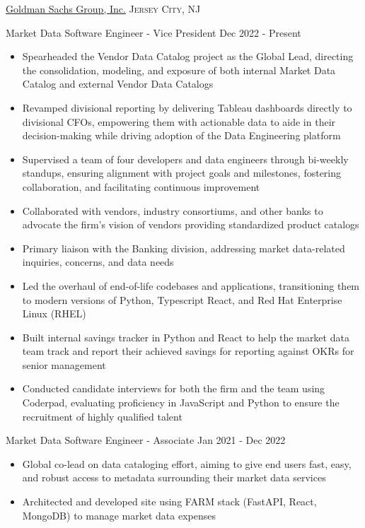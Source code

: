 \documentclass[10pt,letterpaper]{article}
\begin{document}
\headedsection
  {\href{http://www.goldmansachs.com/}{Goldman Sachs Group, Inc.}}
  {\textsc{Jersey City, NJ}} {
  \headedsubsection
    {Market Data Software Engineer - Vice President}
    {Dec 2022 - Present}
    {\begin{itemize}
    \item Spearheaded the Vendor Data Catalog project as the Global Lead, directing the consolidation, modeling, and exposure of both internal Market Data Catalog and external Vendor Data Catalogs
    \item Revamped divisional reporting by delivering Tableau dashboards directly to divisional CFOs, empowering them with actionable data to aide in their decision-making while driving adoption of the Data Engineering platform
    \item Supervised a team of four developers and data engineers through bi-weekly standups, ensuring alignment with project goals and milestones, fostering collaboration, and facilitating continuous improvement
    \item Collaborated with vendors, industry consortiums, and other banks to advocate the firm's vision of vendors providing standardized product catalogs
    \item Primary liaison with the Banking division, addressing market data-related inquiries, concerns, and data needs
    \item Led the overhaul of end-of-life codebases and applications, transitioning them to modern versions of Python, Typescript React, and Red Hat Enterprise Linux (RHEL)
    \item Built internal savings tracker in Python and React to help the market data team track and report their achieved savings for reporting against OKRs for senior management
    \item Conducted candidate interviews for both the firm and the team using Coderpad, evaluating proficiency in JavaScript and Python to ensure the recruitment of highly qualified talent
    \end{itemize}}
  \headedsubsection
    {Market Data Software Engineer - Associate}
    {Jan 2021 - Dec 2022}
    {\begin{itemize}
    \item Global co-lead on data cataloging effort, aiming to give end users fast, easy, and robust access to metadata surrounding their market data services
    \item Architected and developed site using FARM stack (FastAPI, React, MongoDB) to manage market data expenses

\end{itemize}}}
\end{document}
